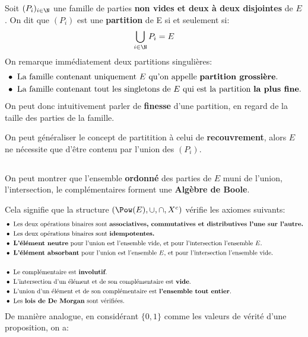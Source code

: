 Soit \((P_i)_{i \in \N}\) une famille de parties \textbf{non vides et deux à deux disjointes} de \(E\).\+
On dit que \((P_i)\) est une \textbf{partition} de E si et seulement si:
\[
    \bigcup_{i \in \N} P_i = E
\]
On remarque immédiatement deux partitions singulières:
\begin{align*}
    &\bullet \text{ La famille contenant uniquement } E \text{ qu'on appelle \textbf{partition grossière}.} \\
    &\bullet \text{ La famille contenant tout les singletons de } E \text{ qui est la partition \textbf{la plus fine}.}
\end{align*}
On peut donc intuitivement parler de \textbf{finesse} d'une partition, en regard de la taille des parties de la famille.\<

On peut généraliser le concept de partitition à celui de \textbf{recouvrement}, alors \(E\) ne nécessite que d'être contenu par l'union des \((P_i)\).

\subsection*{}

On peut montrer que l'ensemble \textbf{ordonné} des parties de \(E\) muni de l'union, l'intersection, le complémentaires forment une \textbf{Algèbre de Boole}.\<

Cela signifie que la structure \((\Pow(E), \cup, \cap, X^c)\) vérifie les axiomes suivants:
\begin{align*}
    &\bullet \text{ Les deux opérations binaires sont \textbf{associatives, commutatives et distributives l'une sur l'autre.}}\\
    &\bullet \text{ Les deux opérations binaires sont \textbf{idempotentes.}}\\
    &\bullet \text{ \textbf{L'élément neutre} pour l'union est l'ensemble vide, et pour l'intersection l'ensemble \(E\).}\\
    &\bullet \text{ \textbf{L'élément absorbant} pour l'union est l'ensemble \(E\), et pour l'intersection l'ensemble vide.}\\
    &\\
    &\bullet \text{ Le complémentaire est \textbf{involutif}.}\\
    &\bullet \text{ L'intersection d'un élément et de son complémentaire est \textbf{vide}.}\\
    &\bullet \text{ L'union d'un élément et de son complémentaire est \textbf{l'ensemble tout entier}.}\\
    &\bullet \text{ Les \textbf{lois de De Morgan} sont vérifiées.}\\
\end{align*}
De manière analogue, en considérant \(\{0, 1\}\) comme les valeurs de vérité d'une proposition, on a:

